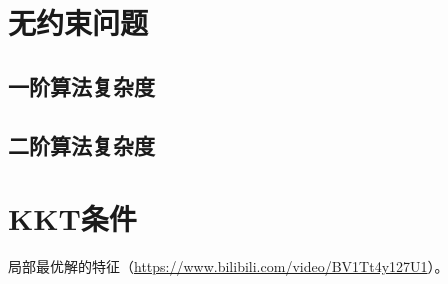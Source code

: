 \documentclass[UTF8]{ctexbook}
\begin{document}
\section{无约束问题}

\subsection{一阶算法复杂度}

\subsection{二阶算法复杂度}


\section{KKT条件}
局部最优解的特征（\url{https://www.bilibili.com/video/BV1Tt4y127U1}）。
\end{document}
